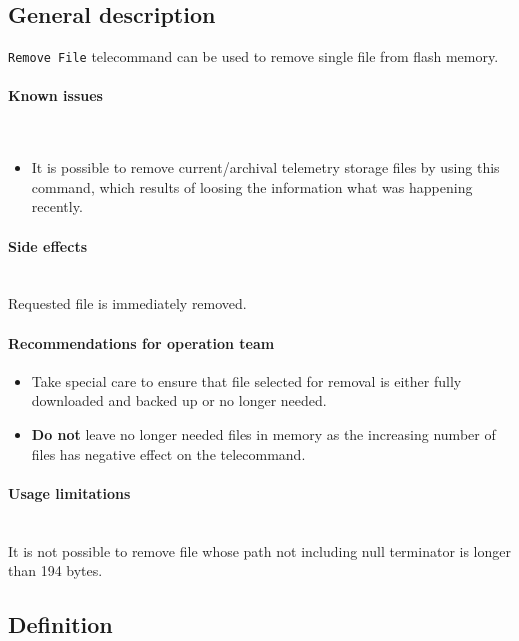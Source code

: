 

\subsection{General description}
\texttt{Remove File} telecommand can be used to remove single file from \OBC flash memory. 

\paragraph{Known issues} \mbox{} \\
\begin{itemize}
    \item It is possible to remove current/archival telemetry storage files by using this command, which
    results of loosing the information what was happening recently. 
\end{itemize}

\paragraph{Side effects} \mbox{} \\
Requested file is immediately removed.

\paragraph{Recommendations for operation team}
\begin{itemize}
    \item Take special care to ensure that file selected for removal is either fully downloaded and
    backed up or no longer needed.
    \item \textbf{Do not} leave no longer needed files in memory as the increasing number of files has negative effect 
    on the  telecommand.
\end{itemize}

\paragraph{Usage limitations}\mbox{}\\ 
It is not possible to remove file whose path not including null terminator is longer than 194 bytes.

\subsection{Definition}

